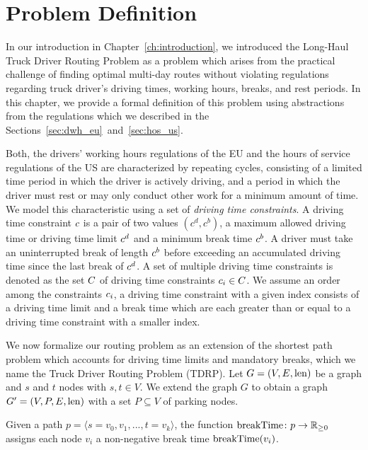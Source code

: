 \chapter{Problem Definition}\label{ch:problem_definitions}
In our introduction in Chapter~\ref{ch:introduction}, we introduced the Long-Haul Truck Driver Routing Problem as a problem which arises from the practical challenge of finding optimal multi-day routes without violating regulations regarding truck driver's driving times, working hours, breaks, and rest periods. In this chapter, we provide a formal definition of this problem using abstractions from the regulations which we described in the Sections~\ref{sec:dwh_eu}~and~\ref{sec:hos_us}.

Both, the drivers' working hours regulations of the EU and the hours of service regulations of the US are characterized by repeating cycles, consisting of a limited time period in which the driver is actively driving, and a period in which the driver must rest or may only conduct other work for a minimum amount of time. We model this characteristic using a set of \emph{driving time constraints}. A driving time constraint $c$ is a pair of two values $(c^d,c^b)$, a maximum allowed driving time or driving time limit $c^d$ and a minimum break time $c^b$. A driver must take an uninterrupted break of length $c^b$ before exceeding an accumulated driving time since the last break of $c^d$. A set of multiple driving time constraints is denoted as the set $C$ of driving time constraints $c_i \in C$. We assume an order among the constraints $c_i$, a driving time constraint with a given index consists of a driving time limit and a break time which are each greater than or equal to a driving time constraint with a smaller index.

We now formalize our routing problem as an extension of the shortest path problem which accounts for driving time limits and mandatory breaks, which we name the Truck Driver Routing Problem (TDRP). Let $G=(V,E,\operatorname{len})$ be a graph and $s$ and $t$ nodes with $s,t \in V$. We extend the graph $G$ to obtain a graph $G'=(V,P,E,\operatorname{len})$ with a set $P \subseteq V$ of parking nodes.

\begin{definition}
	Given a path $p = \langle s=v_0,v_1,...,t=v_k \rangle$, the function $\operatorname{breakTime}\colon p \rightarrow \mathbb{R}_{\ge 0}$ assigns each node $v_i$ a non-negative break time $\operatorname{breakTime}(v_i)$.
\end{definition}

